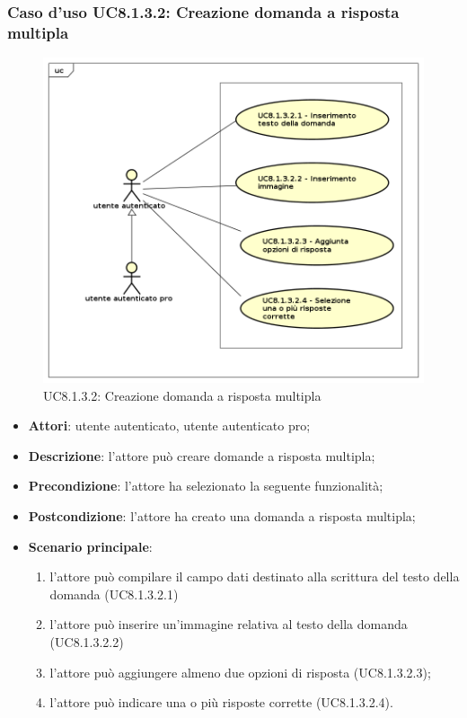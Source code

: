\subsubsection{Caso d'uso UC8.1.3.2: Creazione domanda a risposta multipla}
	\label{UC8.1.3.2}
	\begin{figure}[h]
		\centering
			\includegraphics[scale=0.45,keepaspectratio]{UML/UC8_1_3_2.png}
		\caption{UC8.1.3.2: Creazione domanda a risposta multipla}
	\end{figure}
	\FloatBarrier
	\begin{itemize}
		\item
			\textbf{Attori}: utente autenticato, utente autenticato pro;
		\item		
			\textbf{Descrizione}: l'attore può creare domande a risposta multipla;
		\item
			\textbf{Precondizione}: l'attore ha selezionato la seguente funzionalità; 
		\item
			\textbf{Postcondizione}: l'attore ha creato una domanda a risposta multipla;
		\item
			\textbf{Scenario principale}:
	       		\begin{enumerate}
	       			\item
	       			l'attore può compilare il campo dati destinato alla scrittura del testo della domanda (UC8.1.3.2.1)
	       			\item
	       			l'attore può inserire un'immagine relativa al testo della domanda (UC8.1.3.2.2)
	       			\item
	       			l'attore può aggiungere almeno due opzioni di risposta (UC8.1.3.2.3);
					\item
					l'attore può indicare una o più risposte corrette (UC8.1.3.2.4).
	 			\end{enumerate}
	\end{itemize}

